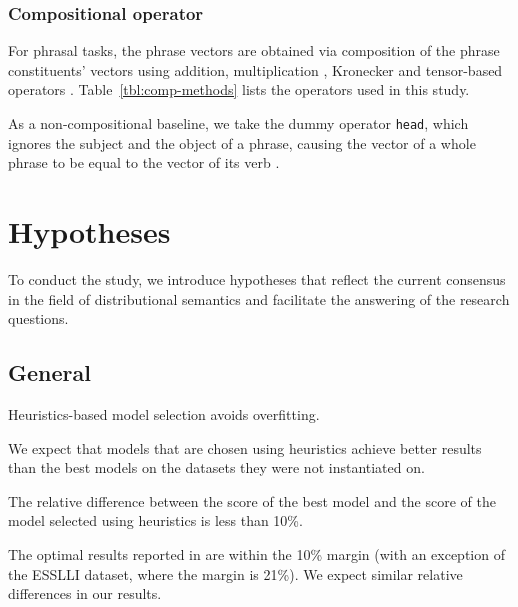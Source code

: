 \subsubsection{Compositional operator}
\label{sec:comp-oper}



For phrasal tasks, the phrase vectors are obtained via composition of the phrase constituents' vectors using addition, multiplication \cite{mitchell2010composition,mitchell-lapata:2008:ACLMain}, Kronecker \cite{Grefenstette:2011:ESC:2145432.2145580} and tensor-based operators \cite{DBLP:journals/corr/abs-1003-4394,kartsadrqpl2014,kartsaklis-sadrzadeh-pulman:2012:POSTERS,Grefenstette:2011:ESC:2145432.2145580}. Table~\ref{tbl:comp-methods} lists the operators used in this study.

As a non-compositional baseline, we take the dummy operator \texttt{head}, which ignores the subject and the object of a phrase, causing the vector of a whole phrase to be equal to the vector of its verb \cite{milajevs-EtAl:2014:EMNLP2014}.

\section{Hypotheses}
\label{sec:hypotheses}

To conduct the study, we introduce hypotheses that reflect the current consensus in the field of distributional semantics and facilitate the answering of the research questions.

\subsection{General}
\label{sec:general-hyp}

\begin{hyp}
\label{hyp:overfitting}
Heuristics-based model selection avoids overfitting.
\end{hyp}

We expect that models that are chosen using heuristics achieve better results than the best models on the datasets they were not instantiated on.

\begin{hyp}
\label{hyp:10percent}
The relative difference between the score of the best model and the score of the model selected using heuristics is less than 10\%.
\end{hyp}

The optimal results reported in  are within the 10\% margin (with an exception of the ESSLLI dataset, where the margin is 21\%). We expect similar relative differences in our results.

